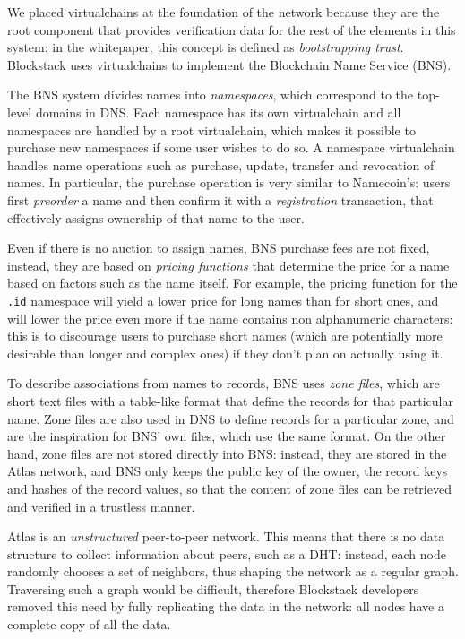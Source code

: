 \documentclass[mscthesis]{usiinfthesis}
\begin{document}
We placed virtualchains at the foundation of the network because they are the root component that provides verification data for the rest of the elements in this system: in the whitepaper, this concept is defined as \emph{bootstrapping trust}. Blockstack uses virtualchains to implement the Blockchain Name Service (BNS).

The BNS system divides names into \emph{namespaces}, which correspond to the top-level domains in DNS. Each namespace has its own virtualchain and all namespaces are handled by a root virtualchain, which makes it possible to purchase new namespaces if some user wishes to do so. A namespace virtualchain handles name operations such as purchase, update, transfer and revocation of names. In particular, the purchase operation is very similar to Namecoin's: users first \emph{preorder} a name and then confirm it with a \emph{registration} transaction, that effectively assigns ownership of that name to the user.

Even if there is no auction to assign names, BNS purchase fees are not fixed, instead, they are based on \emph{pricing functions} that determine the price for a name based on factors such as the name itself. For example, the pricing function for the \texttt{.id} namespace will yield a lower price for long names than for short ones, and will lower the price even more if the name contains non alphanumeric characters: this is to discourage users to purchase short names (which are potentially more desirable than longer and complex ones) if they don't plan on actually using it.

To describe associations from names to records, BNS uses \emph{zone files}, which are short text files with a table-like format that define the records for that particular name. Zone files are also used in DNS to define records for a particular zone, and are the inspiration for BNS' own files, which use the same format. On the other hand, zone files are not stored directly into BNS: instead, they are stored in the Atlas network, and BNS only keeps the public key of the owner, the record keys and hashes of the record values, so that the content of zone files can be retrieved and verified in a trustless manner.

Atlas is an \emph{unstructured} peer-to-peer network. This means that there is no data structure to collect information about peers, such as a DHT: instead, each node randomly chooses a set of neighbors, thus shaping the network as a regular graph. Traversing such a graph would be difficult, therefore Blockstack developers removed this need by fully replicating the data in the network: all nodes have a complete copy of all the data.
\end{document}
